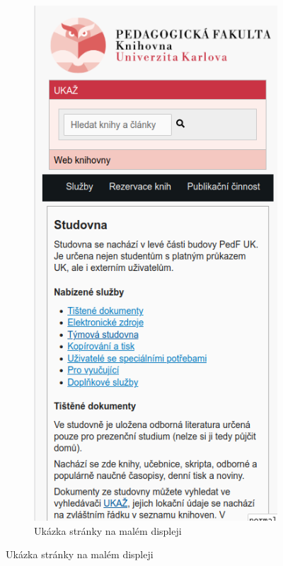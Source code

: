 \documentclass{csbulletin}
\begin{document}
\begin{figure}[tbp]
\begin{subfigure}[t]{0.24\textwidth}
    \includegraphics[width=\textwidth]{img/pedf-web-small.png}
    \caption{Ukázka stránky na malém displeji}
\end{subfigure}
\end{figure}
\end{document}
